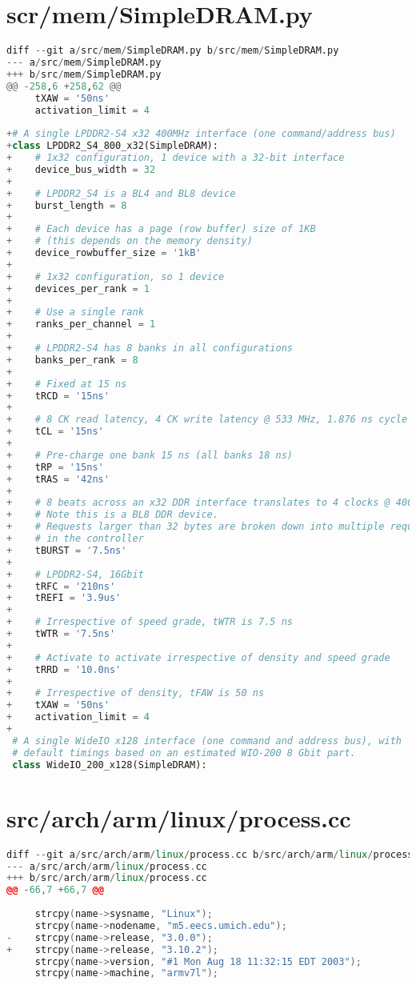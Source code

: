 \section{scr/mem/SimpleDRAM.py}
\label{gem5simpledram}
\begin{lstlisting}[language=python,basicstyle=\tiny,numberstyle=\tiny]
diff --git a/src/mem/SimpleDRAM.py b/src/mem/SimpleDRAM.py
--- a/src/mem/SimpleDRAM.py
+++ b/src/mem/SimpleDRAM.py
@@ -258,6 +258,62 @@
     tXAW = '50ns'
     activation_limit = 4
 
+# A single LPDDR2-S4 x32 400MHz interface (one command/address bus)
+class LPDDR2_S4_800_x32(SimpleDRAM):
+    # 1x32 configuration, 1 device with a 32-bit interface
+    device_bus_width = 32
+
+    # LPDDR2_S4 is a BL4 and BL8 device
+    burst_length = 8
+
+    # Each device has a page (row buffer) size of 1KB
+    # (this depends on the memory density)
+    device_rowbuffer_size = '1kB'
+
+    # 1x32 configuration, so 1 device
+    devices_per_rank = 1
+
+    # Use a single rank
+    ranks_per_channel = 1
+
+    # LPDDR2-S4 has 8 banks in all configurations
+    banks_per_rank = 8
+
+    # Fixed at 15 ns
+    tRCD = '15ns'
+
+    # 8 CK read latency, 4 CK write latency @ 533 MHz, 1.876 ns cycle time
+    tCL = '15ns'
+
+    # Pre-charge one bank 15 ns (all banks 18 ns)
+    tRP = '15ns'
+    tRAS = '42ns'
+
+    # 8 beats across an x32 DDR interface translates to 4 clocks @ 400 MHz.
+    # Note this is a BL8 DDR device.
+    # Requests larger than 32 bytes are broken down into multiple requests
+    # in the controller
+    tBURST = '7.5ns'
+
+    # LPDDR2-S4, 16Gbit
+    tRFC = '210ns'
+    tREFI = '3.9us'
+
+    # Irrespective of speed grade, tWTR is 7.5 ns
+    tWTR = '7.5ns'
+
+    # Activate to activate irrespective of density and speed grade
+    tRRD = '10.0ns'
+
+    # Irrespective of density, tFAW is 50 ns
+    tXAW = '50ns'
+    activation_limit = 4
+
 # A single WideIO x128 interface (one command and address bus), with
 # default timings based on an estimated WIO-200 8 Gbit part.
 class WideIO_200_x128(SimpleDRAM):
\end{lstlisting}
\vfill

\section{src/arch/arm/linux/process.cc}
\begin{lstlisting}[language=C++]
diff --git a/src/arch/arm/linux/process.cc b/src/arch/arm/linux/process.cc
--- a/src/arch/arm/linux/process.cc
+++ b/src/arch/arm/linux/process.cc
@@ -66,7 +66,7 @@
 
     strcpy(name->sysname, "Linux");
     strcpy(name->nodename, "m5.eecs.umich.edu");
-    strcpy(name->release, "3.0.0");
+    strcpy(name->release, "3.10.2");
     strcpy(name->version, "#1 Mon Aug 18 11:32:15 EDT 2003");
     strcpy(name->machine, "armv7l");
\end{lstlisting}
